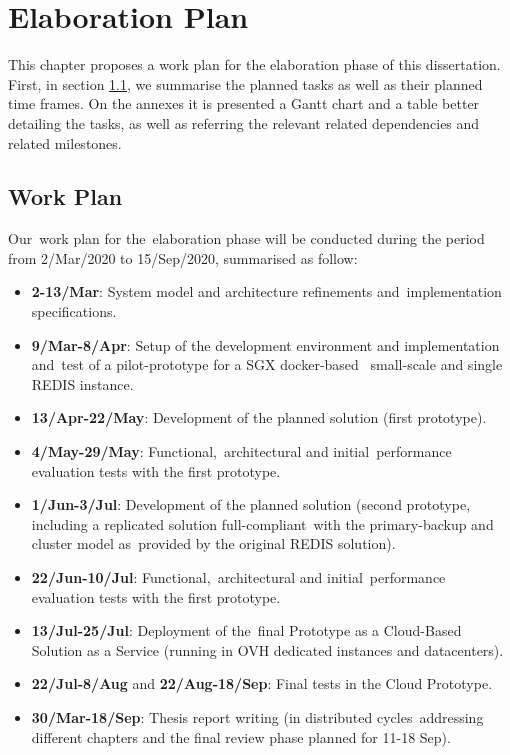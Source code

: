 
\chapter{Elaboration Plan}
\label{cha:elaboration_plan}

This chapter proposes a work plan for the elaboration phase of this dissertation. First, in section \ref{sec:workplan}, we summarise the planned tasks as well as their planned time frames. On the annexes it is presented a Gantt chart and a table better detailing the tasks, as well as referring the relevant related dependencies and related milestones.

\section{Work Plan}
\label{sec:workplan}

Our work plan for the elaboration phase will be conducted during the period from 2/Mar/2020 to 15/Sep/2020, summarised as follow:

\begin{itemize}
	\item \textbf{2-13/Mar}: System model and architecture refinements and implementation specifications.
	\item \textbf{9/Mar-8/Apr}: Setup of the development environment and implementation and test of a pilot-prototype for a SGX docker-based  small-scale and single REDIS instance.
	\item \textbf{13/Apr-22/May}: Development of the planned solution (first prototype).
	\item \textbf{4/May-29/May}: Functional, architectural and initial performance evaluation tests with the first prototype.
	\item \textbf{1/Jun-3/Jul}: Development of the planned solution (second prototype, including a replicated solution full-compliant with the primary-backup and cluster model as provided by the original REDIS solution).
	\item \textbf{22/Jun-10/Jul}: Functional, architectural and initial performance evaluation tests with the first prototype.
	\item \textbf{13/Jul-25/Jul}: Deployment of the final Prototype as a Cloud-Based Solution as a Service (running in OVH dedicated instances and datacenters).
	\item \textbf{22/Jul-8/Aug} and \textbf{22/Aug-18/Sep}: Final tests in the Cloud Prototype.
	\item \textbf{30/Mar-18/Sep}: Thesis report writing (in distributed cycles addressing different chapters and the final review phase planned for 11-18 Sep).
\end{itemize}

